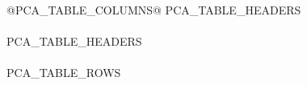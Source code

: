 \begingroup
\small
\setlength{\tabcolsep}{3.5pt}
\renewcommand{\arraystretch}{1.08}
\begin{longtable}{@{}PCA_TABLE_COLUMNS@{}}
\toprule
PCA_TABLE_HEADERS \\
\midrule
\endfirsthead
{}\\
\toprule
PCA_TABLE_HEADERS \\
\midrule
\endhead
\midrule
{}\\
\endfoot
\bottomrule
\endlastfoot
PCA_TABLE_ROWS
\end{longtable}
\endgroup
